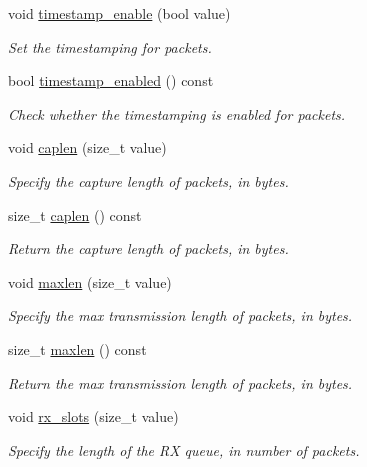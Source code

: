 \begin{DoxyCompactItemize}
void \hyperlink{classnet_1_1pfq_ac8dc23932b27dd04c8ecbdcbabe931b8}{timestamp\+\_\+enable} (bool value)
\begin{DoxyCompactList}\small\item\em Set the timestamping for packets. \end{DoxyCompactList}\item 
bool \hyperlink{classnet_1_1pfq_a7939df6cf5127dd8672e1ca0a68fa648}{timestamp\+\_\+enabled} () const 
\begin{DoxyCompactList}\small\item\em Check whether the timestamping is enabled for packets. \end{DoxyCompactList}\item 
void \hyperlink{classnet_1_1pfq_aa915603b2ad8d1226f9bbea0050945c0}{caplen} (size\+\_\+t value)
\begin{DoxyCompactList}\small\item\em Specify the capture length of packets, in bytes. \end{DoxyCompactList}\item 
size\+\_\+t \hyperlink{classnet_1_1pfq_aa0d64b89a345ca5426a694f6583106c3}{caplen} () const 
\begin{DoxyCompactList}\small\item\em Return the capture length of packets, in bytes. \end{DoxyCompactList}\item 
void \hyperlink{classnet_1_1pfq_a0424e39990711493af4f24a0c3e9be4d}{maxlen} (size\+\_\+t value)
\begin{DoxyCompactList}\small\item\em Specify the max transmission length of packets, in bytes. \end{DoxyCompactList}\item 
size\+\_\+t \hyperlink{classnet_1_1pfq_a869695c441902d0342212d7581f3e362}{maxlen} () const 
\begin{DoxyCompactList}\small\item\em Return the max transmission length of packets, in bytes. \end{DoxyCompactList}\item 
void \hyperlink{classnet_1_1pfq_a878c768492c68fc572a994a58913a3db}{rx\+\_\+slots} (size\+\_\+t value)
\begin{DoxyCompactList}\small\item\em Specify the length of the R\+X queue, in number of packets. \end{DoxyCompactList}\item 

\end{DoxyCompactItemize}
